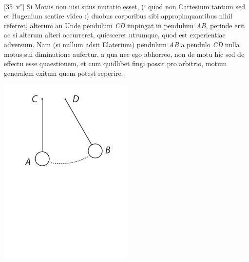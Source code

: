 \vspace*{8mm}
\count{}
\pstart 
\noindent
\normalsize
[35~v\textsuperscript{o}] Si Motus non nisi situs mutatio esset, (: quod non Cartesium\protect{} tantum sed et Hugenium\protect{} sentire video :) duobus corporibus sibi appropinquantibus nihil referret, alterum an  Unde pendulum\protect{} \textit{CD} impingat in pendulum \textit{AB}, perinde erit ac si alterum alteri occurreret,  quiesceret utrumque, quod est experientiae\protect{} adversum. Nam (si nullum adsit Elaterium\protect{}) pendulum \textit{AB} a pendulo \textit{CD} nulla motus sui diminutione aufertur.  a qua nec ego abhorreo, non de motu hic sed de effectu esse quaestionem, et cum quidlibet fingi possit pro arbitrio, motum generalem exitum quem potest reperire.
\pend
\vspace{3.5em}
\pstart
\hspace{8mm}
\begin{minipage}[c]{0.5\textwidth}
\includegraphics[trim = 0mm 0mm 0mm 0mm, clip, width=0.5\textwidth] {images/lh0351303_035r-d1.pdf}
\end{minipage}

